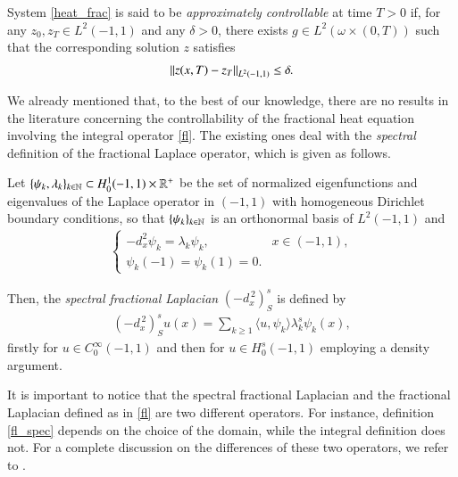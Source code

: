 \begin{definition}
	System \eqref{heat_frac} is said to be \textit{approximately controllable} at time $T>0$ if, for any $z_0,z_T\in L^2(-1,1)$ and any $\delta>0$, there exists $g\in L^2(\omega\times(0,T))$ such that the corresponding solution $z$ satisfies 
	\begin{align*}
		{\left\|z(x,T)-z_T\right\|}_{L^2(-1,1)}\leq\delta.
	\end{align*}
\end{definition}

We already mentioned that, to the best of our knowledge, there are no results in the literature concerning the controllability of the fractional heat equation involving the integral operator \eqref{fl}. The existing ones deal with the \textit{spectral} definition of the fractional Laplace operator, which is given as follows.

Let $\{\psi_k,\lambda_k\}_{k\in\mathbb{N}}\subset H_0^1(-1,1)\times\mathbb{R}^+$ be the set of normalized eigenfunctions and eigenvalues of the Laplace operator in $(-1,1)$ with homogeneous Dirichlet boundary conditions, so that $\{\psi_k\}_{k\in\mathbb{N}}$ is an orthonormal basis of $L^2(-1,1)$ and         
\begin{align*}
	\begin{cases}
		-d_x^2\psi_k =\lambda_k\psi_k, & x\in (-1,1), 
		\\
		\psi_k(-1)=\psi_k(1)=0.
	\end{cases}
\end{align*}

Then, the \textit{spectral fractional Laplacian} $(-d_x^{\,2})^s_S$ is defined by
\begin{align}\label{fl_spec}
	(-d_x^{\,2})^s_S u(x) = \sum_{k\geq 1}\langle u,\psi_k\rangle \lambda_k^s\psi_k(x),
\end{align}
firstly for $u\in C_0^{\infty}(-1,1)$ and then for $u\in H_0^s(-1,1)$ employing a density argument.

It is important to notice that the spectral fractional Laplacian and the fractional Laplacian defined as in \eqref{fl} are two different operators. For instance, definition \eqref{fl_spec} depends on the choice of the domain, while the integral definition does not. For a complete discussion on the differences of these two operators, we refer to \cite{servadei2014spectrum}.

